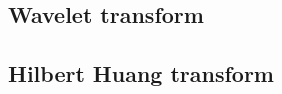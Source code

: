 \documentclass[11pt, oneside]{article}   	%
\begin{document}
\subsection{Wavelet transform}



\subsection{Hilbert Huang transform}
%
\end{document}
